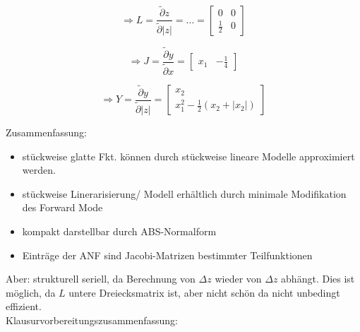 $$\Rightarrow L = \frac{\tilde{\partial} z}{\tilde{\partial}  |z| } = 
\dots = \begin{bmatrix}
0 & 0\\
\frac{1}{2} & 0 
\end{bmatrix}$$

$$\Rightarrow J = \frac{\tilde{\partial} y}{\tilde{\partial}  x} =
\begin{bmatrix}
x_1 & -\frac{1}{4}
\end{bmatrix}$$

$$\Rightarrow Y = \frac{\tilde{\partial} y}{\tilde{\partial}  |z|} = 
\begin{bmatrix}
x_2\\
x_1^2 - \frac{1}{2} (x_2 + |x_2|)
\end{bmatrix}
$$

\noindent
Zusammenfassung:
\begin{itemize}
	\item stückweise glatte Fkt. können durch stückweise lineare Modelle approximiert werden.
	\item stückweise Linerarisierung/ Modell erhältlich durch minimale Modifikation des Forward Mode
	\item kompakt darstellbar durch ABS-Normalform
	\item Einträge der ANF sind Jacobi-Matrizen bestimmter Teilfunktionen
\end{itemize}
Aber: strukturell seriell, da Berechnung von $\Delta z$ wieder von $\Delta z$ abhängt. Dies ist möglich, da $L$ untere Dreiecksmatrix ist, aber nicht schön da nicht unbedingt effizient.\\

\noindent
Klausurvorbereitungszusammenfassung:

